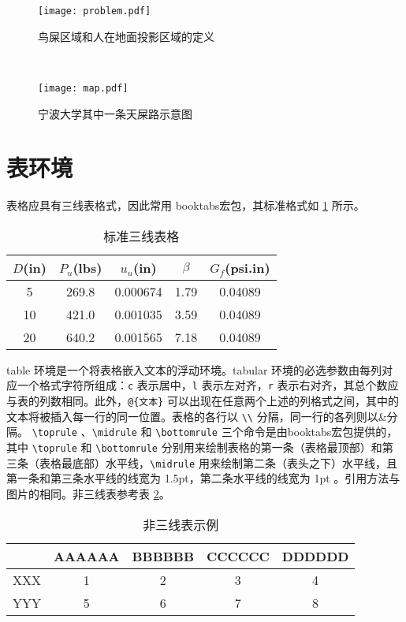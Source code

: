 \begin{figure}[!htb]
    \centering
    \begin{minipage}[c]{0.45\textwidth}
        \centering
        \texttt{[image: problem.pdf]}
        \caption{鸟屎区域和人在地面投影区域的定义}\label{fig:problem}
    \end{minipage}
    \begin{minipage}[c]{0.075\textwidth}
         ~%
    \end{minipage}
    \begin{minipage}[c]{0.45\textwidth}
        \centering
        \texttt{[image: map.pdf]}
        \caption{宁波大学其中一条天屎路示意图}
        \label{fig:map}
    \end{minipage}
\end{figure}


\section{表环境}
表格应具有三线表格式，因此常用 booktabs宏包，其标准格式如 \ref{tab:mytab} 所示。
\begin{table}[!htbp]
    \caption{标准三线表格}\label{tab:mytab} \centering
    \begin{tabular}{ccccc}
        \toprule[1.5pt]
        $D$(in) & $P_u$(lbs) & $u_u$(in) & $\beta$ & $G_f$(psi.in)\\
        \midrule[1pt]
        5 & 269.8 & 0.000674 & 1.79 & 0.04089\\
        10 & 421.0 & 0.001035 & 3.59 & 0.04089\\
        20 & 640.2 & 0.001565 & 7.18 & 0.04089\\
        \bottomrule[1.5pt]
    \end{tabular}
\end{table}

table 环境是一个将表格嵌入文本的浮动环境。tabular 环境的必选参数由每列对应一个格式字符所组成：\verb|c| 表示居中，\verb|l| 表示左对齐，\verb|r| 表示右对齐，其总个数应与表的列数相同。此外，\verb|@{文本}| 可以出现在任意两个上述的列格式之间，其中的文本将被插入每一行的同一位置。表格的各行以 \verb|\\| 分隔，同一行的各列则以\&分隔。 \verb|\toprule| 、\verb|\midrule| 和 \verb|\bottomrule| 三个命令是由booktabs宏包提供的，其中 \verb|\toprule| 和 \verb|\bottomrule| 分别用来绘制表格的第一条（表格最顶部）和第三条（表格最底部）水平线，\verb|\midrule| 用来绘制第二条（表头之下）水平线，且第一条和第三条水平线的线宽为 1.5pt，第二条水平线的线宽为 1pt 。引用方法与图片的相同。非三线表参考表 \ref{tab:Table-example}。
\begin{table}[!htb]
\centering
\caption{非三线表示例}\label{tab:Table-example}
\begin{tabular}{|c|c|c|c|c|}
\hline 
 & AAAAAA & BBBBBB & CCCCCC & DDDDDD\tabularnewline
\hline 
XXX & 1 & 2 & 3 & 4\tabularnewline
\hline 
YYY & 5 & 6 & 7 & 8\tabularnewline
\hline 
\end{tabular}
\end{table}

